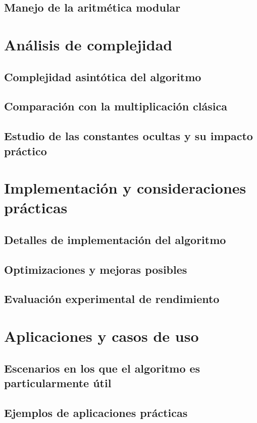 \documentclass{article}
\begin{document}
    \subsection{Manejo de la aritmética modular}
    
\section{Análisis de complejidad}
    \subsection{Complejidad asintótica del algoritmo}
    \subsection{Comparación con la multiplicación clásica}
    \subsection{Estudio de las constantes ocultas y su impacto práctico}
    
\section{Implementación y consideraciones prácticas}
    \subsection{Detalles de implementación del algoritmo}
    \subsection{Optimizaciones y mejoras posibles}
    \subsection{Evaluación experimental de rendimiento}
    
\section{Aplicaciones y casos de uso}
    \subsection{Escenarios en los que el algoritmo es particularmente útil}
    \subsection{Ejemplos de aplicaciones prácticas}
    
\end{document}
